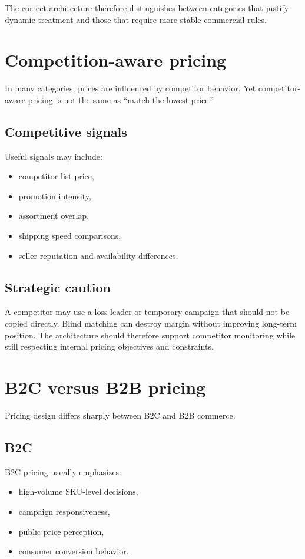 The correct architecture therefore distinguishes between categories that justify dynamic treatment and those that require more stable commercial rules.

\section{Competition-aware pricing}
In many categories, prices are influenced by competitor behavior.
Yet competitor-aware pricing is not the same as ``match the lowest price.''

\subsection{Competitive signals}
Useful signals may include:
\begin{itemize}
  \item competitor list price,
  \item promotion intensity,
  \item assortment overlap,
  \item shipping speed comparisons,
  \item seller reputation and availability differences.
\end{itemize}

\subsection{Strategic caution}
A competitor may use a loss leader or temporary campaign that should not be copied directly.
Blind matching can destroy margin without improving long-term position.
The architecture should therefore support competitor monitoring while still respecting internal pricing objectives and constraints.

\section{B2C versus B2B pricing}
Pricing design differs sharply between B2C and B2B commerce.

\subsection{B2C}
B2C pricing usually emphasizes:
\begin{itemize}
  \item high-volume SKU-level decisions,
  \item campaign responsiveness,
  \item public price perception,
  \item consumer conversion behavior.
\end{itemize}

